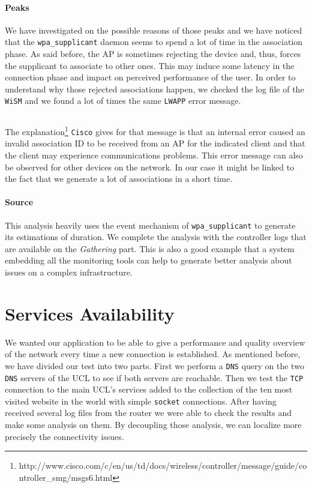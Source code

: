 \paragraph*{Peaks} We have investigated on the possible reasons of those peaks and we have noticed that the \texttt{wpa\_supplicant} daemon seems to spend a lot of time in the association phase. As said before, the AP is sometimes rejecting the device and, thus, forces the supplicant to associate to other ones. This may induce some latency in the connection phase and impact on perceived performance of the user. In order to understand why those rejected associations happen, we checked the log file of the \texttt{WiSM} and we found a lot of times the same \texttt{LWAPP} error message.\\
\begin{lstlisting}[frame=single,breaklines=true,caption={\texttt{WiSM} association error message}]
%LWAPP-3-INVALID_AID2: Association identifier [int] for client [hex]:[hex]:[hex]:[hex]:[hex]:[hex] is already in use by[hex]:[hex]:[hex]:[hex]:[hex]:[hex]
\end{lstlisting}

The explanation\footnote{http://www.cisco.com/c/en/us/td/docs/wireless/controller/message/guide/controller\_smg/msgs6.html} \texttt{Cisco} gives for that message is that an internal error caused an invalid association ID to be received from an AP for the indicated client and that the client may experience communications problems. This error message can also be observed for other devices on the network. In our case it might be linked to the fact that we generate a lot of associations in a short time.

\paragraph*{Source} This analysis heavily uses the event mechanism of \texttt{wpa\_supplicant} to generate its estimations of duration. We complete the analysis with the controller logs that are available on the \emph{Gathering} part. This is also a good example that a system embedding all the monitoring tools can help to generate better analysis about issues on a complex infrastructure.


\section{Services Availability}
We wanted our application to be able to give a performance and quality overview of the network every time a new connection is established. As mentioned before, we have divided our test into two parts. First we perform a \texttt{DNS} query on the two \texttt{DNS} servers of the UCL to see if both servers are reachable. Then we test the \texttt{TCP} connection to the main UCL's services added to the collection of the ten most visited website in the world with simple \texttt{socket} connections. After having received several log files from the router we were able to check the results and make some analysis on them. By decoupling those analysis, we can localize more precisely the connectivity issues.

